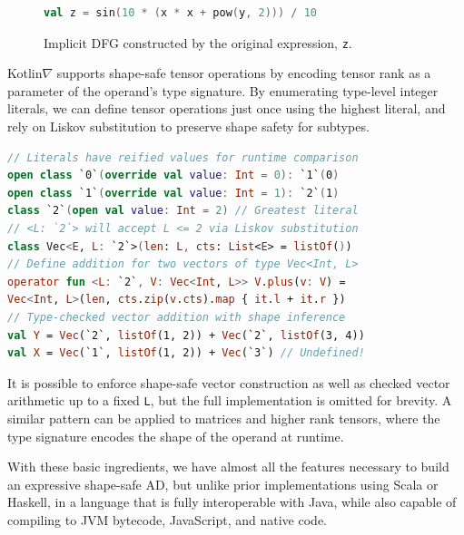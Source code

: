 \documentclass[12pt,initial,twoside,maitrise]{dms}
\numberwithin{equation}{section}
\numberwithin{table}{chapter}
\numberwithin{figure}{chapter}
\begin{document}
\begin{figure}[!htb]
\begin{lstlisting}[caption={The equation below is an EDSL, and does not perform any computation.}, language=Kotlin]
val z = sin(10 * (x * x + pow(y, 2))) / 10
\end{lstlisting}
    \centering
    \caption{Implicit DFG constructed by the original expression, \texttt{z}.}
\end{figure}

Kotlin$\nabla$ supports shape-safe tensor operations by encoding tensor rank as a parameter of the operand's type signature. By enumerating type-level integer literals, we can define tensor operations just once using the highest literal, and rely on Liskov substitution to preserve shape safety for subtypes.

\begin{lstlisting}[caption={Shape safe tensor addition for rank-1 tensors, $\forall L\leq2.$}, language=Kotlin]
// Literals have reified values for runtime comparison
open class `0`(override val value: Int = 0): `1`(0)
open class `1`(override val value: Int = 1): `2`(1)
class `2`(open val value: Int = 2) // Greatest literal
// <L: `2`> will accept L <= 2 via Liskov substitution
class Vec<E, L: `2`>(len: L, cts: List<E> = listOf())
// Define addition for two vectors of type Vec<Int, L>
operator fun <L: `2`, V: Vec<Int, L>> V.plus(v: V) =
Vec<Int, L>(len, cts.zip(v.cts).map { it.l + it.r })
// Type-checked vector addition with shape inference
val Y = Vec(`2`, listOf(1, 2)) + Vec(`2`, listOf(3, 4))
val X = Vec(`1`, listOf(1, 2)) + Vec(`3`) // Undefined!
\end{lstlisting}

It is possible to enforce shape-safe vector construction as well as checked vector arithmetic up to a fixed \texttt{L}, but the full implementation is omitted for brevity. A similar pattern can be applied to matrices and higher rank tensors, where the type signature encodes the shape of the operand at runtime.

With these basic ingredients, we have almost all the features necessary to build an expressive shape-safe AD, but unlike prior implementations using Scala or Haskell, in a language that is fully interoperable with Java, while also capable of compiling to JVM bytecode, JavaScript, and native code.
\end{document}
